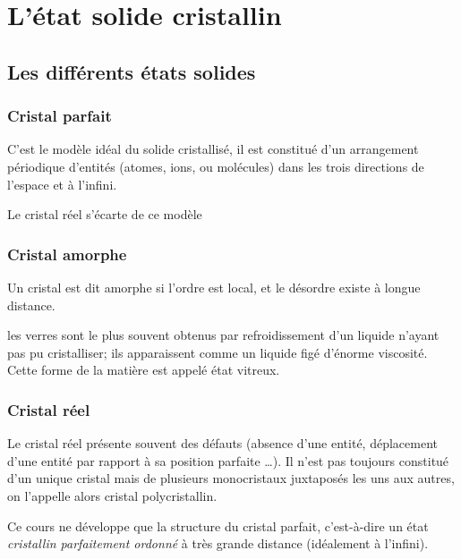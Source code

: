 \chapter{L'état solide cristallin}
\section{Les différents états solides}
\subsection{Cristal parfait}
C'est le modèle idéal du solide cristallisé, il est constitué d'un arrangement
périodique d’entités (atomes, ions, ou molécules) dans les trois directions
de l’espace et à l’infini.
\begin{rem}
    Le cristal réel s'écarte de ce modèle
\end{rem}

\subsection{Cristal amorphe}
Un cristal est dit amorphe si l'ordre est local, et le désordre existe
à longue distance.
\begin{ex}[le verre]
    les verres sont le plus souvent obtenus par refroidissement d’un liquide
    n’ayant pas pu cristalliser; ils apparaissent comme un liquide figé 
    d’énorme viscosité. Cette forme de la matière est appelé état vitreux.
\end{ex}

\subsection{Cristal réel}
Le cristal réel présente souvent des défauts (absence d'une entité, déplacement
d'une entité par rapport à sa position parfaite \dots). Il n'est pas toujours 
constitué d’un unique cristal mais de plusieurs monocristaux juxtaposés
les uns aux autres, on l’appelle alors cristal polycristallin.
\begin{rem}
    Ce cours ne développe que la structure du cristal parfait, c'est-à-dire un
    état \emph{cristallin parfaitement ordonné} à très grande distance
    (idéalement à l'infini).
\end{rem}


